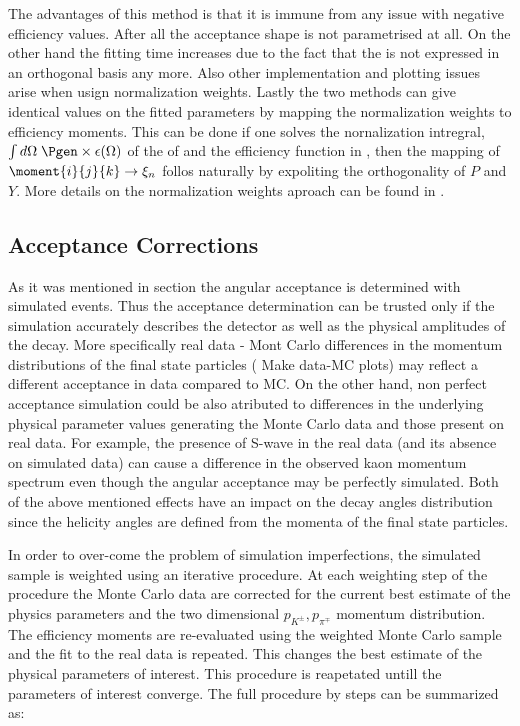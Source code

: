 The advantages of this method is that it is immune from any issue with negative efficiency values. After all the acceptance shape is not parametrised at all.
On the other hand the fitting time increases due to the fact that the \pdf is not expressed in an orthogonal basis any more. Also other
implementation and plotting issues arise when usign normalization weights. Lastly the two methods can give identical values on the fitted parameters by mapping 
the normalization weights to efficiency moments. This can be done if one solves the nornalization intregral, $\int d\Omega\;\Pgen\times\epsilon(\Omega)$
of the \pdf of  and the efficiency function in , then the mapping of $\moment{i}{j}{k} \rightarrow \xi_n$ follos naturally
by expoliting the orthogonality of $P$ and $Y$. More details on the normalization weights aproach can be found in \cite{jeroenThesis}. 

\subsection{Acceptance Corrections}
\label{Accceptance_Corrections}
As it was mentioned in section  the angular acceptance is determined with simulated \BsJpsiKst events.
Thus the acceptance determination can be trusted only if the simulation accurately describes the detector as well as the 
physical amplitudes of the \BsJpsiKst decay. More specifically real data - Mont Carlo differences in the momentum distributions
of the final state particles (\figref{} {\color{red} Make data-MC plots}) may reflect a different acceptance in data compared to MC. On the other hand,
non perfect acceptance simulation could be also atributed to differences in the underlying physical parameter values generating 
the Monte Carlo data and those present on real data. For example, the presence of S-wave in the real data (and its absence on simulated data)
can cause a difference in the observed kaon momentum spectrum even though the angular acceptance may be perfectly simulated.
Both of the above mentioned effects have an impact on the decay angles distribution since the helicity angles are defined
from the momenta of the final state particles. 

In order to over-come the problem of simulation imperfections, the simulated sample is weighted using an iterative procedure. 
At each weighting step of the procedure the Monte Carlo data are corrected for the current best estimate of the physics 
parameters and the two dimensional $p_{K^{\pm}},p_{\pi^{\mp}}$ momentum distribution. 
The efficiency moments are re-evaluated using the weighted Monte Carlo sample and the fit to the real data is repeated. 
This changes the best estimate of the physical parameters of interest. This procedure is reapetated untill the parameters
of interest converge. The full procedure by steps can be summarized as:

